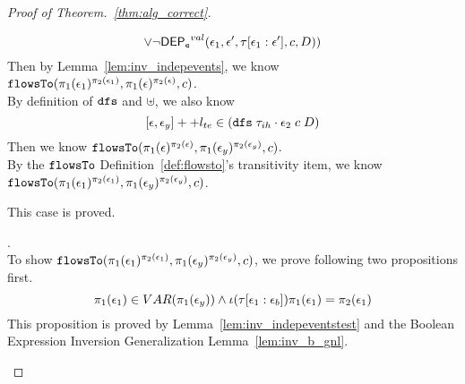 \begin{proof}[Proof of Theorem.~\ref{thm:alg_correct}]
\begin{case}
\begin{subcase}
\begin{subsubcase}
\begin{subproof}
\[    \lor 
    \neg \mathsf{DEP_{\mathtt{e}}}^{val} (\mathtt{\epsilon}_1, \mathtt{\epsilon}', \mathtt{\tau}[\mathtt{\epsilon}_1: \mathtt{\epsilon}'], c, D))
  \]
Then by Lemma~\ref{lem:inv_indepevents}, we know  $\mathtt{flowsTo}(\pi_1(\mathtt{\epsilon}_1)^{\pi_2(\mathtt{\epsilon}_1)}, \pi_1(\mathtt{\epsilon})^{\pi_2(\mathtt{\epsilon})}, c)$.
\\
  By definition of $\mathtt{dfs}$ and $\uplus$, we also know 
  \[ 
    [\mathtt{\epsilon}, \mathtt{\epsilon}_y] ++ l_{te} \in (\mathtt{dfs} \; {\mathtt{\tau}_{ih} \cdot \mathtt{\epsilon}_2} \; c \; D )
  \]
  Then we know $\mathtt{flowsTo}(\pi_1(\mathtt{\epsilon})^{\pi_2(\mathtt{\epsilon})}, \pi_1(\mathtt{\epsilon}_y)^{\pi_2(\mathtt{\epsilon}_y)}, c)$.
%
\\
By the $\mathtt{flowsTo}$ Definition~\ref{def:flowsto}'s transitivity item, we know $\mathtt{flowsTo}(\pi_1(\mathtt{\epsilon}_1)^{\pi_2(\mathtt{\epsilon}_1)}, \pi_1(\mathtt{\epsilon}_y)^{\pi_2(\mathtt{\epsilon}_y)}, c)$.

\end{subproof}
%
%
This case is proved.
%
\end{subsubcase}
%
\end{subcase}
%
%
\begin{subcase}[One Testing Event: $l_e = {[\event_1, \event_b, \event_y]} ++ l_t$ ].
\\
To show $\mathtt{flowsTo}(\pi_1(\mathtt{\epsilon}_1)^{\pi_2(\mathtt{\epsilon}_1)}, \pi_1(\mathtt{\epsilon}_y)^{\pi_2(\mathtt{\epsilon}_y)}, c) $,
we prove following two propositions first.
\[
  \pi_1(\mathtt{\epsilon}_1) \in VAR(\pi_1(\mathtt{\epsilon}_y)) \land \iota(\mathtt{\tau}[\mathtt{\epsilon}_1:\mathtt{\epsilon}_b]) \pi_1(\mathtt{\epsilon}_1) = \pi_2(\mathtt{\epsilon}_1)
\]
This proposition is proved by Lemma~\ref{lem:inv_indepeventstest} and the Boolean Expression Inversion Generalization Lemma~\ref{lem:inv_b_gnl}.

\end{subcase}
\end{case}
\end{proof}
